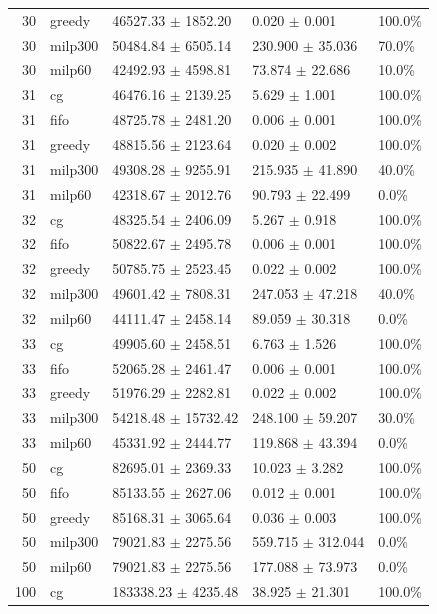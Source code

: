 \begin{tabular}{rllll}
30 & greedy & 46527.33 $\pm$ 1852.20 & 0.020 $\pm$ 0.001 & 100.0\% \\
30 & milp300 & 50484.84 $\pm$ 6505.14 & 230.900 $\pm$ 35.036 & 70.0\% \\
30 & milp60 & 42492.93 $\pm$ 4598.81 & 73.874 $\pm$ 22.686 & 10.0\% \\
31 & cg & 46476.16 $\pm$ 2139.25 & 5.629 $\pm$ 1.001 & 100.0\% \\
31 & fifo & 48725.78 $\pm$ 2481.20 & 0.006 $\pm$ 0.001 & 100.0\% \\
31 & greedy & 48815.56 $\pm$ 2123.64 & 0.020 $\pm$ 0.002 & 100.0\% \\
31 & milp300 & 49308.28 $\pm$ 9255.91 & 215.935 $\pm$ 41.890 & 40.0\% \\
31 & milp60 & 42318.67 $\pm$ 2012.76 & 90.793 $\pm$ 22.499 & 0.0\% \\
32 & cg & 48325.54 $\pm$ 2406.09 & 5.267 $\pm$ 0.918 & 100.0\% \\
32 & fifo & 50822.67 $\pm$ 2495.78 & 0.006 $\pm$ 0.001 & 100.0\% \\
32 & greedy & 50785.75 $\pm$ 2523.45 & 0.022 $\pm$ 0.002 & 100.0\% \\
32 & milp300 & 49601.42 $\pm$ 7808.31 & 247.053 $\pm$ 47.218 & 40.0\% \\
32 & milp60 & 44111.47 $\pm$ 2458.14 & 89.059 $\pm$ 30.318 & 0.0\% \\
33 & cg & 49905.60 $\pm$ 2458.51 & 6.763 $\pm$ 1.526 & 100.0\% \\
33 & fifo & 52065.28 $\pm$ 2461.47 & 0.006 $\pm$ 0.001 & 100.0\% \\
33 & greedy & 51976.29 $\pm$ 2282.81 & 0.022 $\pm$ 0.002 & 100.0\% \\
33 & milp300 & 54218.48 $\pm$ 15732.42 & 248.100 $\pm$ 59.207 & 30.0\% \\
33 & milp60 & 45331.92 $\pm$ 2444.77 & 119.868 $\pm$ 43.394 & 0.0\% \\
50 & cg & 82695.01 $\pm$ 2369.33 & 10.023 $\pm$ 3.282 & 100.0\% \\
50 & fifo & 85133.55 $\pm$ 2627.06 & 0.012 $\pm$ 0.001 & 100.0\% \\
50 & greedy & 85168.31 $\pm$ 3065.64 & 0.036 $\pm$ 0.003 & 100.0\% \\
50 & milp300 & 79021.83 $\pm$ 2275.56 & 559.715 $\pm$ 312.044 & 0.0\% \\
50 & milp60 & 79021.83 $\pm$ 2275.56 & 177.088 $\pm$ 73.973 & 0.0\% \\
100 & cg & 183338.23 $\pm$ 4235.48 & 38.925 $\pm$ 21.301 & 100.0\% \\

\end{tabular}
